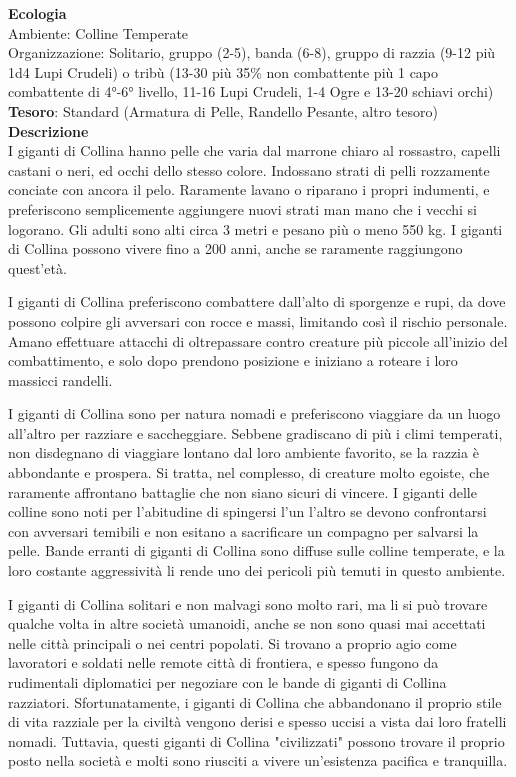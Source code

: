 \begin{multicols}{2}
\textbf{Ecologia}\\
Ambiente: Colline Temperate\\
Organizzazione: Solitario, gruppo (2-5), banda (6-8), gruppo di razzia (9-12 più 1d4 Lupi Crudeli) o tribù (13-30 più 35\% non combattente più 1 capo combattente di 4°-6° livello, 11-16 Lupi Crudeli, 1-4 Ogre e 13-20 schiavi orchi)\\
\textbf{Tesoro}: Standard (Armatura di Pelle, Randello Pesante, altro tesoro)\\
\textbf{Descrizione}\\
I giganti di Collina hanno pelle che varia dal marrone chiaro al rossastro, capelli castani o neri, ed occhi dello stesso colore. Indossano strati di pelli rozzamente conciate con ancora il pelo. Raramente lavano o riparano i propri indumenti, e preferiscono semplicemente aggiungere nuovi strati man mano che i vecchi si logorano. Gli adulti sono alti circa 3 metri e pesano più o meno 550 kg. I giganti di Collina possono vivere fino a 200 anni, anche se raramente raggiungono quest'età.

I giganti di Collina preferiscono combattere dall'alto di sporgenze e rupi, da dove possono colpire gli avversari con rocce e massi, limitando così il rischio personale. Amano effettuare attacchi di oltrepassare contro creature più piccole all'inizio del combattimento, e solo dopo prendono posizione e iniziano a roteare i loro massicci randelli.

I giganti di Collina sono per natura nomadi e preferiscono viaggiare da un luogo all'altro per razziare e saccheggiare. Sebbene gradiscano di più i climi temperati, non disdegnano di viaggiare lontano dal loro ambiente favorito, se la razzia è abbondante e prospera. Si tratta, nel complesso, di creature molto egoiste, che raramente affrontano battaglie che non siano sicuri di vincere. I giganti delle colline sono noti per l'abitudine di spingersi l'un l'altro se devono confrontarsi con avversari temibili e non esitano a sacrificare un compagno per salvarsi la pelle. Bande erranti di giganti di Collina sono diffuse sulle colline temperate, e la loro costante aggressività li rende uno dei pericoli più temuti in questo ambiente.


I giganti di Collina solitari e non malvagi sono molto rari, ma li si può trovare qualche volta in altre società umanoidi, anche se non sono quasi mai accettati nelle città principali o nei centri popolati. Si trovano a proprio agio come lavoratori e soldati nelle remote città di frontiera, e spesso fungono da rudimentali diplomatici per negoziare con le bande di giganti di Collina razziatori. Sfortunatamente, i giganti di Collina che abbandonano il proprio stile di vita razziale per la civiltà vengono derisi e spesso uccisi a vista dai loro fratelli nomadi. Tuttavia, questi giganti di Collina "civilizzati" possono trovare il proprio posto nella società e molti sono riusciti a vivere un'esistenza pacifica e tranquilla.



\end{multicols}

